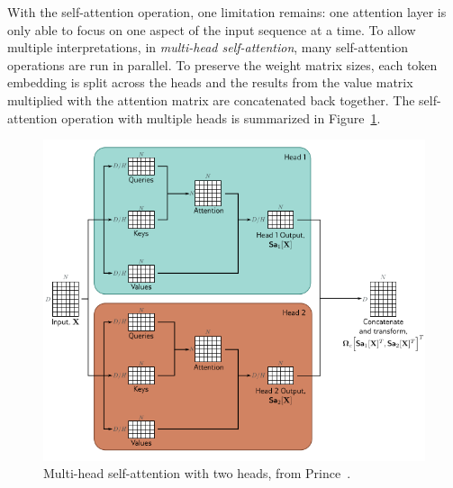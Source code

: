 \documentclass[english,twoside,openright]{UH_DS_MSc}
\begin{document}
With the self-attention operation, one limitation remains: one attention layer is only able to focus on one aspect of the 
input sequence at a time. To allow multiple interpretations, in \textit{multi-head self-attention}, many self-attention operations are run in parallel. To preserve the weight matrix sizes, each token embedding is split across the heads and the 
results from the value matrix multiplied with the attention matrix are concatenated back together. The self-attention operation with multiple heads is summarized in Figure~\ref{fig:multi-head-self-attention}.

\begin{figure}[ht]
    \centering
    \includegraphics*[scale=0.57]{images/multiheadattention.png}
    \caption{Multi-head self-attention with two heads, from Prince~\cite{princebook}.}
    \label{fig:multi-head-self-attention}
\end{figure}
\end{document}
